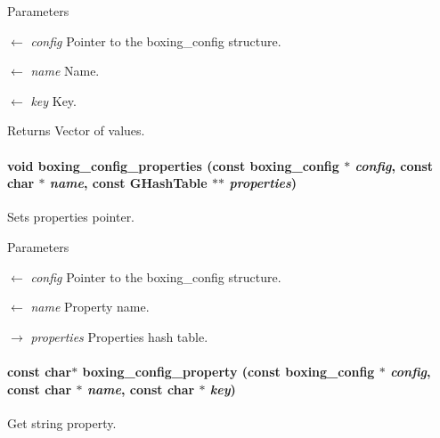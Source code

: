 \begin{DoxyParams}{Parameters}
\item[\mbox{$\leftarrow$} {\em config}]Pointer to the boxing\_\-config structure. \item[\mbox{$\leftarrow$} {\em name}]Name. \item[\mbox{$\leftarrow$} {\em key}]Key. \end{DoxyParams}
\begin{DoxyReturn}{Returns}
Vector of values. 
\end{DoxyReturn}
\hypertarget{group__config_gac01d325efa09fedfeae80c786be002c9}{
\paragraph[{boxing\_\-config\_\-properties}]{\setlength{\rightskip}{0pt plus 5cm}void boxing\_\-config\_\-properties (const {\bf boxing\_\-config} $\ast$ {\em config}, \/  const char $\ast$ {\em name}, \/  const GHashTable $\ast$$\ast$ {\em properties})}\hfill}
\label{group__config_gac01d325efa09fedfeae80c786be002c9}
Sets properties pointer.


\begin{DoxyParams}{Parameters}
\item[\mbox{$\leftarrow$} {\em config}]Pointer to the boxing\_\-config structure. \item[\mbox{$\leftarrow$} {\em name}]Property name. \item[\mbox{$\rightarrow$} {\em properties}]Properties hash table. \end{DoxyParams}
\hypertarget{group__config_ga4065b7a4d735f8df7e12900d73b4fb7a}{
\paragraph[{boxing\_\-config\_\-property}]{\setlength{\rightskip}{0pt plus 5cm}const char$\ast$ boxing\_\-config\_\-property (const {\bf boxing\_\-config} $\ast$ {\em config}, \/  const char $\ast$ {\em name}, \/  const char $\ast$ {\em key})}\hfill}
\label{group__config_ga4065b7a4d735f8df7e12900d73b4fb7a}
Get string property.


